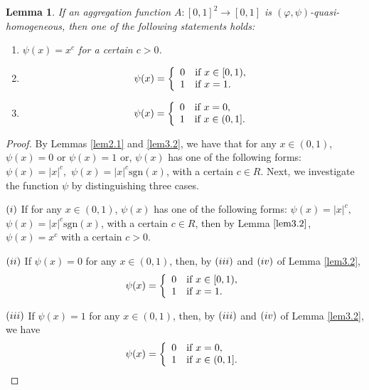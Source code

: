 \documentclass[12pt]{article}
\newtheorem{lemma}{\bf Lemma}[section]
\begin{document}
\begin{lemma}\label{lemma3.1}
If an aggregation function $A:[0, 1]^2\rightarrow[0, 1]$ is $(\varphi, \psi)$-quasi-homogeneous, then one of the following statements holds:
\begin{enumerate}
\item [(\romannumeral 1)] $\psi(x)=x^c $ for a certain $c >0$.
\item [(\romannumeral 2)]
\begin{equation*}
\psi(x)=\left\{\begin{array}{ll}
0 & {\mbox{\scriptsize\normalsize if  } x \in[0, 1),}\\
1 & {\mbox{\scriptsize\normalsize if  } x=1.}
\end{array}
\right.
\end{equation*}
\item [(\romannumeral 3)] \begin{equation*}
\psi(x)=\left\{\begin{array}{ll}
0 & {\mbox{\scriptsize\normalsize if } x=0,}\\
1 & {\mbox{\scriptsize\normalsize if } x \in(0, 1].}
\end{array}
\right.
\end{equation*}
\end{enumerate}
\end{lemma}
\begin{proof}
By Lemmas \ref{lem2.1} and \ref{lem3.2}, we have that for any $x\in (0, 1)$, $\psi(x)=0$ or $\psi(x)=1$ or, $\psi(x)$ has one of the following forms:
$\psi(x)= |x|^c, $ $ \psi(x)= |x|^c \mbox{sgn}(x)$,
with a certain $c\in R$.
Next, we investigate the function $\psi$ by distinguishing three cases.

$(\romannumeral 1)$ If for any $x\in (0, 1)$, $\psi(x)$ has one of the following forms:
$\psi(x)= |x|^c, $ $ \psi(x)= |x|^c \mbox{sgn}(x)$,
with a certain $c\in R$, then by Lemma $\ref{lem3.2}$, $\psi(x)= x^c$ with a certain $c>0$.

$(\romannumeral 2)$ If $\psi(x)=0$ for any $x\in (0, 1)$, then, by $(\romannumeral 3)$ and $(\romannumeral 4)$ of Lemma \ref{lem3.2}, $$\psi(x)=\left\{\begin{array}{ll}
0 & {\mbox{\scriptsize\normalsize if } x \in[0, 1),}\\
1 & {\mbox{\scriptsize\normalsize if } x=1.}
\end{array}
\right. $$

$(\romannumeral 3)$ If $\psi(x)=1$ for any $x\in (0, 1)$, then, by $(\romannumeral 3)$ and $(\romannumeral 4)$ of Lemma \ref{lem3.2}, we have $$\psi(x)=\left\{\begin{array}{ll}
0 & {\mbox{\scriptsize\normalsize if } x=0,}\\
1 & {\mbox{\scriptsize\normalsize if } x \in(0, 1].}
\end{array}
\right. $$
\end{proof}
\end{document}
